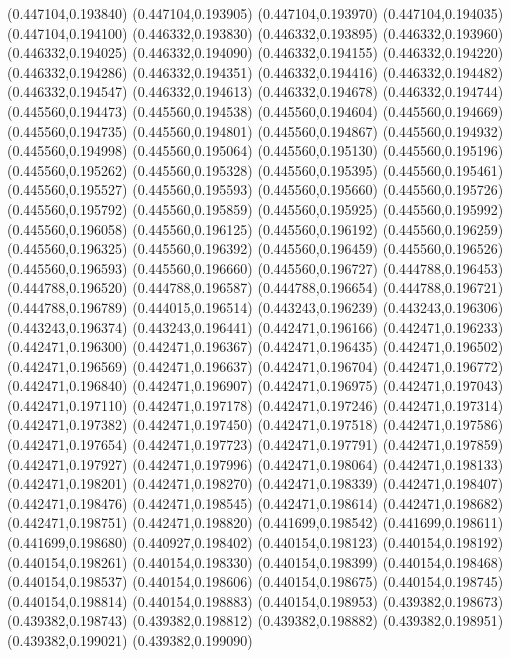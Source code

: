 (0.447104,0.193840)
(0.447104,0.193905)
(0.447104,0.193970)
(0.447104,0.194035)
(0.447104,0.194100)
(0.446332,0.193830)
(0.446332,0.193895)
(0.446332,0.193960)
(0.446332,0.194025)
(0.446332,0.194090)
(0.446332,0.194155)
(0.446332,0.194220)
(0.446332,0.194286)
(0.446332,0.194351)
(0.446332,0.194416)
(0.446332,0.194482)
(0.446332,0.194547)
(0.446332,0.194613)
(0.446332,0.194678)
(0.446332,0.194744)
(0.445560,0.194473)
(0.445560,0.194538)
(0.445560,0.194604)
(0.445560,0.194669)
(0.445560,0.194735)
(0.445560,0.194801)
(0.445560,0.194867)
(0.445560,0.194932)
(0.445560,0.194998)
(0.445560,0.195064)
(0.445560,0.195130)
(0.445560,0.195196)
(0.445560,0.195262)
(0.445560,0.195328)
(0.445560,0.195395)
(0.445560,0.195461)
(0.445560,0.195527)
(0.445560,0.195593)
(0.445560,0.195660)
(0.445560,0.195726)
(0.445560,0.195792)
(0.445560,0.195859)
(0.445560,0.195925)
(0.445560,0.195992)
(0.445560,0.196058)
(0.445560,0.196125)
(0.445560,0.196192)
(0.445560,0.196259)
(0.445560,0.196325)
(0.445560,0.196392)
(0.445560,0.196459)
(0.445560,0.196526)
(0.445560,0.196593)
(0.445560,0.196660)
(0.445560,0.196727)
(0.444788,0.196453)
(0.444788,0.196520)
(0.444788,0.196587)
(0.444788,0.196654)
(0.444788,0.196721)
(0.444788,0.196789)
(0.444015,0.196514)
(0.443243,0.196239)
(0.443243,0.196306)
(0.443243,0.196374)
(0.443243,0.196441)
(0.442471,0.196166)
(0.442471,0.196233)
(0.442471,0.196300)
(0.442471,0.196367)
(0.442471,0.196435)
(0.442471,0.196502)
(0.442471,0.196569)
(0.442471,0.196637)
(0.442471,0.196704)
(0.442471,0.196772)
(0.442471,0.196840)
(0.442471,0.196907)
(0.442471,0.196975)
(0.442471,0.197043)
(0.442471,0.197110)
(0.442471,0.197178)
(0.442471,0.197246)
(0.442471,0.197314)
(0.442471,0.197382)
(0.442471,0.197450)
(0.442471,0.197518)
(0.442471,0.197586)
(0.442471,0.197654)
(0.442471,0.197723)
(0.442471,0.197791)
(0.442471,0.197859)
(0.442471,0.197927)
(0.442471,0.197996)
(0.442471,0.198064)
(0.442471,0.198133)
(0.442471,0.198201)
(0.442471,0.198270)
(0.442471,0.198339)
(0.442471,0.198407)
(0.442471,0.198476)
(0.442471,0.198545)
(0.442471,0.198614)
(0.442471,0.198682)
(0.442471,0.198751)
(0.442471,0.198820)
(0.441699,0.198542)
(0.441699,0.198611)
(0.441699,0.198680)
(0.440927,0.198402)
(0.440154,0.198123)
(0.440154,0.198192)
(0.440154,0.198261)
(0.440154,0.198330)
(0.440154,0.198399)
(0.440154,0.198468)
(0.440154,0.198537)
(0.440154,0.198606)
(0.440154,0.198675)
(0.440154,0.198745)
(0.440154,0.198814)
(0.440154,0.198883)
(0.440154,0.198953)
(0.439382,0.198673)
(0.439382,0.198743)
(0.439382,0.198812)
(0.439382,0.198882)
(0.439382,0.198951)
(0.439382,0.199021)
(0.439382,0.199090)
